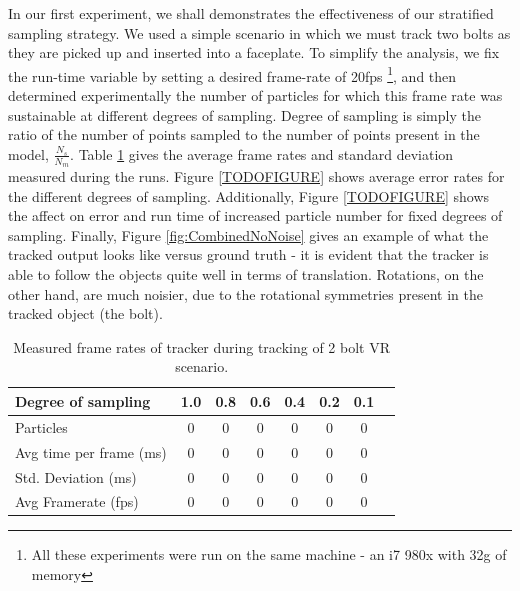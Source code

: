 In our first experiment, we shall demonstrates the effectiveness of our stratified sampling strategy. We used a simple scenario in which we must track two bolts as they are picked up and inserted into a faceplate. To simplify the analysis, we fix the run-time variable by setting a desired frame-rate of 20fps \footnote{All these experiments were run on the same machine - an i7 980x with 32g of memory}, and then determined experimentally the number of particles for which this frame rate was sustainable at different degrees of sampling. Degree of sampling is simply the ratio of the number of points sampled to the number of points present in the model, $\frac{N_s}{N_m}$. Table \ref{table:timing} gives the average frame rates and standard deviation measured during the runs. Figure \ref{TODOFIGURE} shows average error rates for the different degrees of sampling. Additionally, Figure \ref{TODOFIGURE} shows the affect on error and run time of increased particle number for fixed degrees of sampling. Finally, Figure \ref{fig:CombinedNoNoise} gives an example of what the tracked output looks like versus ground truth - it is evident that the tracker is able to follow the objects quite well in terms of translation. Rotations, on the other hand, are much noisier, due to the rotational symmetries present in the tracked object (the bolt).  


\begin{table}
\caption{Measured frame rates of tracker during tracking of 2 bolt VR scenario.}
\label{table:timing}
\begin{center}
\begin{tabular}{|l|c|c|c|c|c|c|c|}
\hline
Degree of sampling &  1.0  & 0.8 & 0.6 & 0.4 & 0.2 & 0.1 \\
\hline\hline
Particles  & 0 & 0 & 0 & 0 & 0 & 0\\
Avg time per frame (ms) & 0 & 0 & 0 & 0 & 0 & 0\\
Std. Deviation (ms)     & 0 & 0 & 0 & 0 & 0 & 0\\
Avg Framerate (fps)     & 0 & 0 & 0 & 0 & 0 & 0\\
\hline
\end{tabular}
\end{center}
\end{table}



